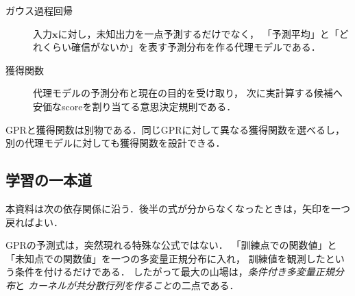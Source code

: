 \documentclass[a4paper,11pt]{ltjsarticle}
\begin{document}
\begin{definitionbox}[GPRと獲得関数の役割]
\begin{description}
  \item[ガウス過程回帰] 入力\(\bm x\)に対し，未知出力を一点予測するだけでなく，
  「予測平均」と「どれくらい確信がないか」を表す予測分布を作る代理モデルである．
  \item[獲得関数] 代理モデルの予測分布と現在の目的を受け取り，
  次に実計算する候補へ安価なscoreを割り当てる意思決定規則である．
\end{description}
GPRと獲得関数は別物である．同じGPRに対して異なる獲得関数を選べるし，
別の代理モデルに対しても獲得関数を設計できる．
\end{definitionbox}

\subsection{学習の一本道}

本資料は次の依存関係に沿う．後半の式が分からなくなったときは，矢印を一つ戻ればよい．

\begin{center}
\end{center}

\begin{intuitionbox}[本資料の中心]
GPRの予測式は，突然現れる特殊な公式ではない．
「訓練点での関数値」と「未知点での関数値」を一つの多変量正規分布に入れ，
訓練値を観測したという条件を付けるだけである．
したがって最大の山場は，\emph{条件付き多変量正規分布}と
\emph{カーネルが共分散行列を作ること}の二点である．
\end{intuitionbox}
\end{document}
